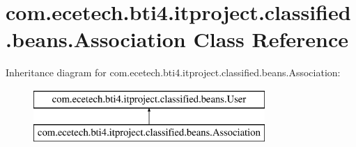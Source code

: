 \hypertarget{classcom_1_1ecetech_1_1bti4_1_1itproject_1_1classified_1_1beans_1_1_association}{}\section{com.\+ecetech.\+bti4.\+itproject.\+classified.\+beans.\+Association Class Reference}
\label{classcom_1_1ecetech_1_1bti4_1_1itproject_1_1classified_1_1beans_1_1_association}
Inheritance diagram for com.\+ecetech.\+bti4.\+itproject.\+classified.\+beans.\+Association\+:\begin{figure}[H]
\begin{center}
\leavevmode
\includegraphics[height=2.000000cm]{classcom_1_1ecetech_1_1bti4_1_1itproject_1_1classified_1_1beans_1_1_association}
\end{center}
\end{figure}
